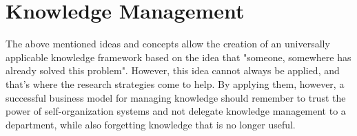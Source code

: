 \documentclass{article}
\begin{document}
\section{Knowledge Management}
The above mentioned ideas and concepts allow the creation of an universally applicable knowledge framework based on the idea that "someone, somewhere has already solved this problem". However, this idea cannot always be applied, and that's where the research strategies come to help. By applying them, however, a successful business model for managing knowledge should remember to trust the power of self-organization systems and not delegate knowledge management to a department, while also forgetting knowledge that is no longer useful.
\end{document}
